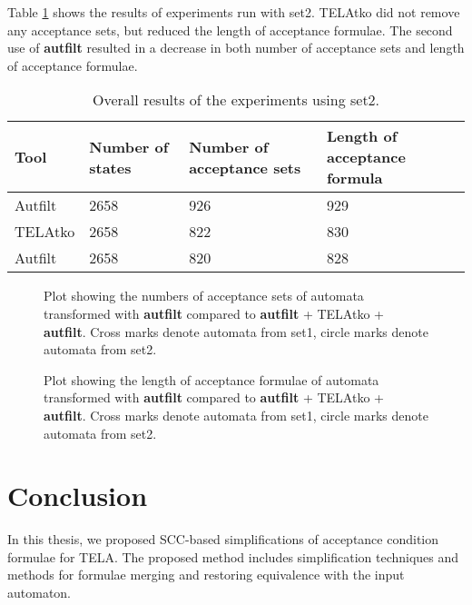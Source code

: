 \documentclass[
  digital, %
  twoside, %
  table,   %
  lof,     %
  lot,     %
]{fithesis3}
\begin{document}
Table \ref{tab:ltl3tela} shows the results of experiments run with set2. TELAtko did not remove any acceptance sets, but reduced the length of acceptance formulae. The second use of \textbf{autfilt} resulted in a decrease in both number of acceptance sets and length of acceptance formulae.

\begin{table}[h]
  \begin{tabularx}{\textwidth}{lXXX}
    \toprule
    Tool & Number of states & Number of acceptance sets & Length of acceptance formula  \\
    \midrule
    Autfilt & 2658 & 926 & 929 \\
    TELAtko & 2658 & 822 & 830 \\
    Autfilt & 2658 & 820 & 828 \\    
    \bottomrule
  \end{tabularx}
  \caption{Overall results of the experiments using set2.}
  \label{tab:ltl3tela}
\end{table}

\begin{figure}[h!]
  \centering
    \begin{tikzpicture}
      
    \end{tikzpicture}
  \caption{Plot showing the numbers of acceptance sets of automata transformed with \textbf{autfilt} compared to \textbf{autfilt} + TELAtko + \textbf{autfilt}. Cross marks denote automata from set1, circle marks denote automata from set2.}
  \label{fig:scplot_marks}
\end{figure}

\begin{figure}[h]
  \centering
    \begin{tikzpicture}
      
    \end{tikzpicture}
  \caption{Plot showing the length of acceptance formulae of automata transformed with \textbf{autfilt} compared to \textbf{autfilt} + TELAtko + \textbf{autfilt}. Cross marks denote automata from set1, circle marks denote automata from set2.}
  \label{fig:scplot_formula_len}
\end{figure}

\chapter{Conclusion}
In this thesis, we proposed SCC-based simplifications of acceptance condition formulae for TELA. The proposed method includes simplification techniques and methods for formulae merging and restoring equivalence with the input automaton.
\end{document}
